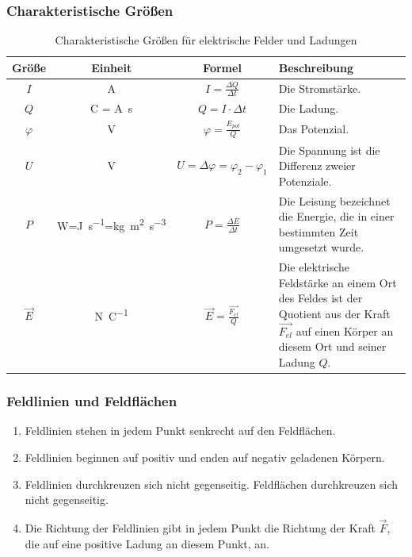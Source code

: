 \documentclass[a4paper]{article}
\begin{document}
			\subsubsection{Charakteristische Größen}
			\begin{table}[H]
				\def\arraystretch{1.5}
				\begin{tabularx}{\textwidth}{|c|c|c|X|}\hline
					Größe & Einheit & Formel & Beschreibung \\\hline
					$I$ & \si{\ampere} & $I=\frac{\Delta Q}{\Delta t}$ & Die Stromstärke.\\\hline
					$Q$ & \si{\coulomb} = \si{\ampere\second} & $Q=I\cdot\Delta t$ & Die Ladung.\\\hline
					$\varphi$ & \si{\volt} & $\varphi=\frac{E_{pot}}{Q}$ & Das Potenzial.\\\hline
					$U$ & \si{\volt} & $U=\Delta\varphi=\varphi_2-\varphi_1$ & Die Spannung ist die Differenz zweier Potenziale.\\\hline
					$P$ & \si{\watt}=\si{\joule\per\second}=\si{\kg\meter\squared\per\second\cubed} & $P=\frac{\Delta E}{\Delta t}$ & Die Leisung bezeichnet die Energie, die in einer bestimmten Zeit umgesetzt wurde.\\\hline
					$\vec{E}$ & \si{\newton\per\coulomb} & $\vec{E}=\frac{\vec{F_{el}}}{Q}$ & Die elektrische Feldstärke an einem Ort des Feldes ist der Quotient aus der Kraft $\vec{F_{el}}$ auf einen Körper an diesem Ort und seiner Ladung $Q$.\\\hline
				\end{tabularx}
				\caption {Charakteristische Größen für elektrische Felder und Ladungen}
				\label{table:elektrische_felder_grossen}
			\end{table}
				
			\subsubsection{Feldlinien und Feldflächen}
				\begin{enumerate}
					\item Feldlinien stehen in jedem Punkt senkrecht auf den Feldflächen.
					\item Feldlinien beginnen auf positiv und enden auf negativ geladenen Körpern.
					\item Feldlinien durchkreuzen sich nicht gegenseitig. Feldflächen durchkreuzen sich nicht gegenseitig.
					\item Die Richtung der Feldlinien gibt in jedem Punkt die Richtung der Kraft $\vec{F}$, die auf eine positive Ladung an diesem Punkt, an.
				\end{enumerate}
		
\end{document}
